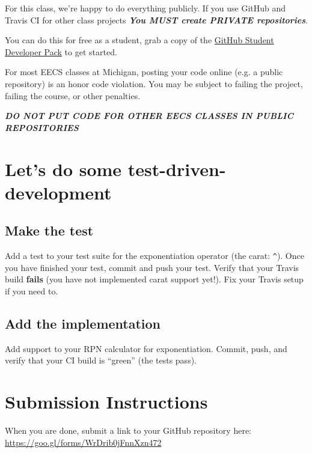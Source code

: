 \documentclass{article}
\begin{document}
\begin{mdframed}\centering
For this class, we're happy to do everything publicly. If you use GitHub and
Travis CI for other class projects
\textbf{\emph{\large You MUST create PRIVATE repositories}}.

You can do this for free as a student, grab a copy of the
\href{https://education.github.com/pack}{GitHub Student Developer Pack} to get
started.

{\color{red}
  For most EECS classes at Michigan, posting your code online (e.g. a public
  repository) is an honor code violation. You may be subject to failing the
  project, failing the course, or other penalties.

  \textbf{\emph{\Large DO NOT PUT CODE FOR OTHER EECS CLASSES IN PUBLIC REPOSITORIES}}
}
\end{mdframed}










\newpage

\section{Let's do some test-driven-development}

\subsection{Make the test}
Add a test to your test suite for the exponentiation operator (the carat:
\texttt{\^{}}). Once you have finished your test, commit and push your test.
Verify that your Travis build \textbf{fails} (you have not implemented carat
support yet!). Fix your Travis setup if you need to.

\subsection{Add the implementation}
Add support to your RPN calculator for exponentiation. Commit, push,
and verify that your CI build is ``green'' (the tests pass).


\section*{Submission Instructions}
When you are done, submit a link to your GitHub repository here: \url{https://goo.gl/forms/WrDrib0jFnnXzn472}
\end{document}
